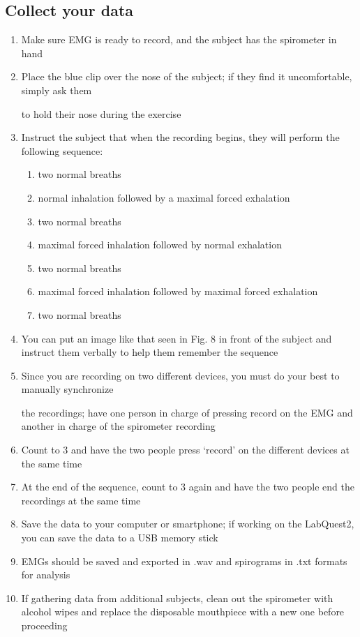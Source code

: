\documentclass{article}
\begin{document}
\subsection{Collect your data}

\begin{enumerate}
\item Make sure EMG is ready to record, and the subject has the spirometer in hand


\item Place the blue clip over the nose of the subject; if they find it uncomfortable, simply ask them

to hold their nose during the exercise


\item Instruct the subject that when the recording begins, they will perform the following sequence:

\begin{enumerate}
\item two normal breaths
\item normal inhalation followed by a maximal forced exhalation
\item two normal breaths
\item maximal forced inhalation followed by normal exhalation
\item two normal breaths
\item maximal forced inhalation followed by maximal forced exhalation
\item two normal breaths
\end{enumerate}


\item You can put an image like that seen in Fig. 8 in front of the subject and instruct them verbally to help them remember the sequence


\item Since you are recording on two different devices, you must do your best to manually synchronize

the recordings; have one person in charge of pressing record on the EMG and another in charge of the spirometer recording


\item Count to 3 and have the two people press `record' on the different devices at the same time


\item At the end of the sequence, count to 3 again and have the two people end the recordings at the same time


\item Save the data to your computer or smartphone; if working on the LabQuest2, you can save the data to a USB memory stick


\item EMGs should be saved and exported in .wav and spirograms in .txt formats for analysis


\item If gathering data from additional subjects, clean out the spirometer with alcohol wipes and replace the disposable mouthpiece with a new one before proceeding
\end{enumerate}

\clearpage

\end{document}
